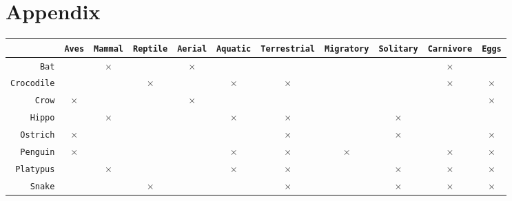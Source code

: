 \onecolumn
\section*{Appendix}
\begin{table}[h]
	\centering
	\begin{tabular}{r|cccccccccc}
		                   & \texttt{Aves} & \texttt{Mammal} & \texttt{Reptile} & \texttt{Aerial} & \texttt{Aquatic} & \texttt{Terrestrial} & \texttt{Migratory} & \texttt{Solitary} & \texttt{Carnivore} & \texttt{Eggs} \\
		\hline
		\texttt{Bat}       &               & $\times$        &                  & $\times$        &                  &                      &                    &                   & $\times$           &               \\
		\texttt{Crocodile} &               &                 & $\times$         &                 & $\times$         & $\times$             &                    &                   & $\times$           & $\times$      \\
		\texttt{Crow}      & $\times$      &                 &                  & $\times$        &                  &                      &                    &                   &                    & $\times$      \\
		\texttt{Hippo}     &               & $\times$        &                  &                 & $\times$         & $\times$             &                    & $\times$          &                    &               \\
		\texttt{Ostrich}   & $\times$      &                 &                  &                 &                  & $\times$             &                    & $\times$          &                    & $\times$      \\
		\texttt{Penguin}   & $\times$      &                 &                  &                 & $\times$         & $\times$             & $\times$           &                   & $\times$           & $\times$      \\
		\texttt{Platypus}  &               & $\times$        &                  &                 & $\times$         & $\times$             &                    & $\times$          & $\times$           & $\times$      \\
		\texttt{Snake}     &               &                 & $\times$         &                 &                  & $\times$             &                    & $\times$          & $\times$           & $\times$      \\

\end{tabular}
\end{table}
